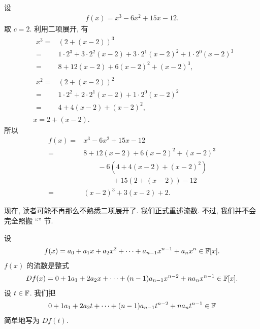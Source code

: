 \begin{example}
    设
    \begin{align*}
        f(x) = x^3 - 6x^2 + 15x - 12.
    \end{align*}
    取 $c = 2$. 利用二项展开, 有
    \begin{align*}
         & \begin{aligned}
            x^3
            = {} & (2 + (x - 2))^3                                                             \\
            = {} & 1 \cdot 2^3 + 3 \cdot 2^2 (x-2) + 3 \cdot 2^1 (x-2)^2 + 1 \cdot 2^0 (x-2)^3 \\
            = {} & 8 + 12(x-2) + 6(x-2)^2 + (x-2)^3,
        \end{aligned} \\
         & \begin{aligned}
            x^2
            = {} & (2 + (x - 2))^2                                       \\
            = {} & 1 \cdot 2^2 + 2 \cdot 2^1 (x-2) + 1 \cdot 2^0 (x-2)^2 \\
            = {} & 4 + 4(x-2) + (x-2)^2,
        \end{aligned} \\
         & x = 2 + (x-2).
    \end{align*}
    所以
    \begin{align*}
        f(x)
        = {} & x^3 - 6x^2 + 15x - 12              \\
        = {} & 8 + 12(x-2) + 6(x-2)^2 + (x-2)^3   \\
             & \qquad - 6(4 + 4(x-2) + (x-2)^2)   \\
             & \qquad \qquad + 15(2 + (x-2)) - 12 \\
        = {} & (x-2)^3 + 3(x-2) + 2.
    \end{align*}
\end{example}

现在, 读者可能不再那么不熟悉二项展开了. 我们正式重述流数. 不过, 我们并不会完全照搬 ``\Fluxions'' 节.

\begin{definition}
    设
    \begin{align*}
        f(x) = a_0 + a_1 x + a_2 x^2 + \cdots + a_{n-1} x^{n-1} + a_n x^n \in \mathbb{F}[x].
    \end{align*}
    $f(x)$ 的流数是整式
    \begin{align*}
        Df(x) = 0 + 1a_1 + 2a_2 x + \cdots + (n-1)a_{n-1} x^{n-2} + na_n x^{n-1} \in \mathbb{F}[x].
    \end{align*}
    设 $t \in \mathbb{F}$. 我们把
    \begin{align*}
        0 + 1a_1 + 2a_2 t + \cdots + (n-1)a_{n-1} t^{n-2} + na_n t^{n-1} \in \mathbb{F}
    \end{align*}
    简单地写为 $Df(t)$.
\end{definition}

